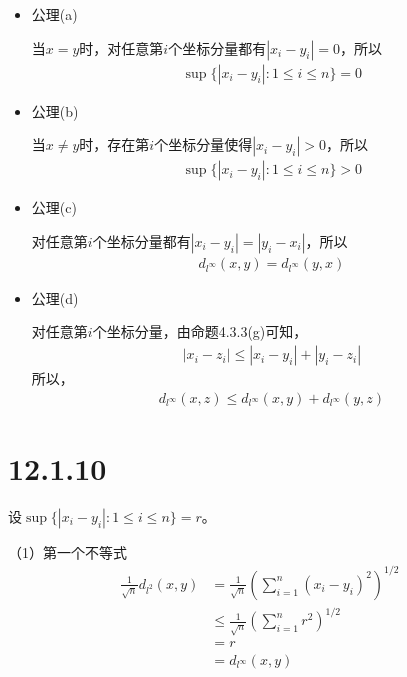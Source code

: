 \documentclass{article}
\begin{document}
\begin{itemize}
      \item 公理(a)

            当$x = y$时，对任意第$i$个坐标分量都有$|x_i - y_i| = 0$，所以
            \begin{align*}
                  \sup\{|x_i - y_i|: 1 \leq i \leq n\} = 0
            \end{align*}

      \item 公理(b)

            当$x \neq y$时，存在第$i$个坐标分量使得$|x_i - y_i| > 0$，所以
            \begin{align*}
                  \sup\{|x_i - y_i|: 1 \leq i \leq n\} > 0
            \end{align*}

      \item 公理(c)

            对任意第$i$个坐标分量都有$|x_i - y_i| = |y_i - x_i|$，所以
            \begin{align*}
                  d_{l^\infty}(x, y) = d_{l^\infty}(y, x)
            \end{align*}

      \item 公理(d)

            对任意第$i$个坐标分量，由命题4.3.3(g)可知，
            \begin{align*}
                  |x_i - z_i| \leq |x_i - y_i| + |y_i - z_i|
            \end{align*}
            所以，
            \begin{align*}
                  d_{l^\infty}(x, z) \leq d_{l^\infty}(x, y) + d_{l^\infty}(y, z)
            \end{align*}
\end{itemize}

\section*{12.1.10}

设$\sup\{|x_i - y_i|: 1 \leq i \leq n\} = r$。

（1）第一个不等式
\begin{align*}
      \frac{1}{\sqrt{n}}d_{l^2}(x, y) & = \frac{1}{\sqrt{n}} \left(\sum \limits_{i = 1}^n (x_i - y_i)^2\right)^{1/2} \\
                                      & \leq \frac{1}{\sqrt{n}} \left(\sum \limits_{i = 1}^n r^2\right)^{1/2}        \\
                                      & = r                                                                          \\
                                      & = d_{l^\infty}(x, y)
\end{align*}
\end{document}
